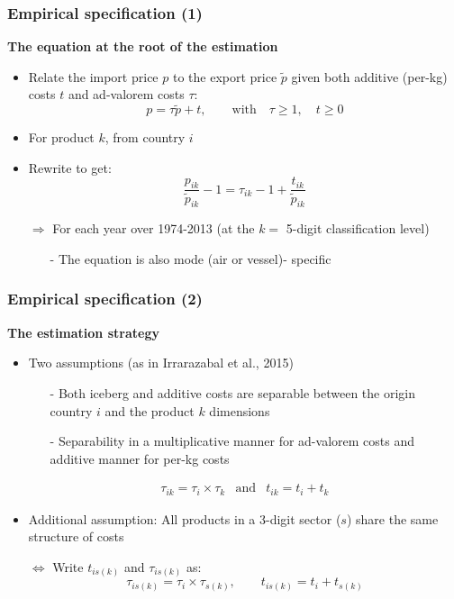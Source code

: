 \documentclass[10 pt,Helvetica, french]{beamer}
\begin{document}
\begin{frame}
\frametitle{Empirical specification (1)}
\textbf{The equation at the root of the estimation}
\begin{itemize}
\item Relate the import price $p$ to the export price $\widetilde{p}$ given both additive (per-kg) costs $t$ and ad-valorem costs $\tau$:
$$p = \tau \widetilde{p} + t, \qquad \text{with}\quad \tau \geq 1,\quad t \geq 0$$
\item For product $k$, from country $i$  \vspace{0.1cm}
\item Rewrite to get:
\begin{equation}
\frac{p_{ik}}{\widetilde{p}_{ik}} -1 = \tau_{ik} -1 +\frac{t_{ik}}{ \widetilde{p}_{ik}} \label{eq:basis_equation}
\end{equation}
\item[$\Rightarrow$] For each year over 1974-2013 (at the $k=$ 5-digit classification level) \vspace{0.1cm}
\begin{itemize}
\item[-] The equation is also mode (air or vessel)- specific
\end{itemize}
\end{itemize}
\end{frame}

\begin{frame}
\frametitle{Empirical specification (2)}
\textbf{The estimation strategy}
\begin{itemize}
\item Two assumptions (as in Irrarazabal et al., 2015) \vspace{0.1cm}
\begin{itemize}
\item[-] Both iceberg and additive costs are separable between the origin country $i$ and the product $k$ dimensions \vspace{0.1cm}
\item[-] Separability in a multiplicative manner for ad-valorem costs and additive manner for per-kg costs \vspace{0.1cm}
\end{itemize}
\footnotesize
\begin{eqnarray*}
\tau_{ik} = \tau_i \times \tau_k &\text{and}& t_{ik} = t_i + t_k
\end{eqnarray*}
\normalsize
\item Additional assumption: All products in a 3-digit sector ($s$) share the same structure of costs \vspace{0.1cm}
\item[$\Leftrightarrow$] Write $t_{is(k)}$ and $\tau_{is(k)}$ as:
\footnotesize
\begin{equation}
 \tau_{is(k)} = \tau_{i} \times \tau_{s(k)}, \qquad t_{is(k)} = t_{i} + t_{s(k)} \label{eq:specifTC}
 \end{equation}
 \normalsize
\end{itemize}
\end{frame}
\end{document}

